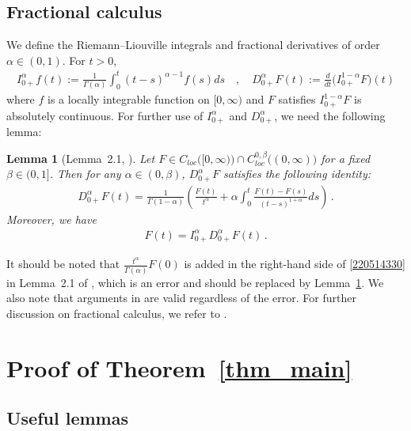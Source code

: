 \documentclass[11pt]{amsart}
\theoremstyle{plain}
\newtheorem{lemma}[theorem]{Lemma}
\theoremstyle{definition}
\theoremstyle{remark}
\numberwithin{equation}{section}
\begin{document}
\subsection{Fractional calculus}
We define the Riemann--Liouville integrals and fractional derivatives of order $\alpha \in (0,1)$. 
For $t>0$,
\begin{align*}
  I_{0+}^\alpha f(t) := \frac{1}{\Gamma(\alpha)} \int_0^t (t-s)^{\alpha-1} f(s) ds\quad,\quad  D_{0+}^{\alpha}F(t) := \frac{d}{dt}\big(I_{0+}^{1-\alpha}F\big)(t)
\end{align*}
where $f$ is a locally integrable function on $[0,\infty)$ and $F$ satisfies $I_{0+}^{1-\alpha}F$ is absolutely continuous.
For further use of $I_{0+}^\alpha$ and $D_{0+}^\alpha$, we need the following lemma:
\begin{lemma}[Lemma~2.1, \cite{LeeSeo_2023}]\label{lem_fraccal}
Let $F\in C_{loc}\big([0,\infty)\big)\cap C^{0,\beta}_{loc}\big((0,\infty)\big)$ for a fixed $\beta\in(0,1]$.
Then for any $\alpha\in(0,\beta)$, $D^{\alpha}_{0+}F$ satisfies the following identity:
\begin{align}\label{220514332}
D^{\alpha}_{0+}F(t)=\frac{1}{\Gamma(1-\alpha)}\left(\frac{F(t)}{t^{\alpha}}+\alpha\int_0^t\frac{F(t)-F(s)}{(t-s)^{1+\alpha}}ds\right)\,.
\end{align}
Moreover, we have
\begin{align}\label{220514330}
F(t)=I_{0+}^{\alpha}D_{0+}^{\alpha}F(t)\,.
\end{align}
\end{lemma}
It should be noted that $\frac{t^\alpha}{\Gamma(\alpha)}F(0)$ is added in the right-hand side of \eqref{220514330} in Lemma~2.1 of \cite{LeeSeo_2023}, which is an error and should be replaced by Lemma~\ref{lem_fraccal}. 
We also note that arguments in \cite{LeeSeo_2023} are valid regardless of the error.
For further discussion on fractional calculus, we refer to \cite{Kip1960,Sam_Kil_Ma1993}.





\section{Proof of Theorem~\ref{thm_main}}


\subsection{Useful lemmas}
\end{document}
